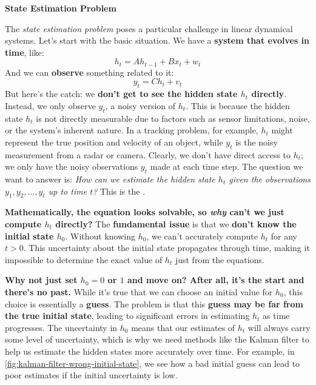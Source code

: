 \highspace
\begin{flushleft}
    \textcolor{Red2}{ \textbf{State Estimation Problem}}\label{def:state-estimation-problem}
\end{flushleft}
The \emph{state estimation problem} poses a particular challenge in linear dynamical systems. Let's start with the basic situation. We have a \textbf{system that evolves in time}, like:
\begin{equation*}
    h_t = A h_{t-1} + B x_t + w_t
\end{equation*}
And we can \textbf{observe} something related to it:
\begin{equation*}
    y_t = C h_t + v_t
\end{equation*}
But here's the catch: we \textbf{don't get to see the hidden state $h_t$ directly}. Instead, we only observe $y_t$, a noisy version of $h_t$. This is because the hidden state $h_t$ is not directly measurable due to factors such as sensor limitations, noise, or the system's inherent nature. In a tracking problem, for example, $h_t$ might represent the true position and velocity of an object, while $y_t$ is the noisy measurement from a radar or camera. Clearly, we don't have direct access to $h_t$; we only have the noisy observations $y_t$ made at each time step. The question we want to answer is: \emph{How can we estimate the hidden state $h_t$ given the observations $y_1, y_2, \ldots, y_t$ up to time $t$?} This is the .

\highspace
\textcolor{Green3}{ \textbf{Mathematically, the equation looks solvable, so \emph{why} can't we just compute $h_t$ directly?}} The \textbf{fundamental issue} is that we \textbf{don't know the initial state $h_0$}. Without knowing $h_0$, we can't accurately compute $h_t$ for any $t > 0$. This uncertainty about the initial state propagates through time, making it impossible to determine the exact value of $h_t$ just from the equations.

\highspace
\textcolor{Green3}{ \textbf{Why not just set $h_0 = 0$ or $1$ and move on? After all, it's the start and there's no past.}} While it's true that we can choose an initial value for $h_0$, this choice is essentially a \textbf{guess}. The problem is that this \textbf{guess may be far from the true initial state}, leading to significant errors in estimating $h_t$ as time progresses. The uncertainty in $h_0$ means that our estimates of $h_t$ will always carry some level of uncertainty, which is why we need methods like the Kalman filter to help us estimate the hidden states more accurately over time. For example, in \autoref{fig:kalman-filter-wrong-initial-state}, we see how a bad initial guess can lead to poor estimates if the initial uncertainty is low.

